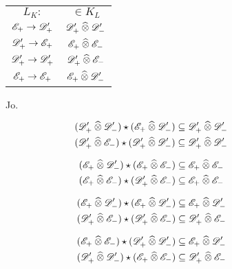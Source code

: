 \begin{figure}
    \centering
    \begin{tabular}{cc}
        $ L_K \colon $
        &
        $ \in K_L $
        \\[3ex]
        $ \fsSmocau \to \fsDiscau $
        &
        $ \fsDiscau \ctepro \fsDisaca $
        \\[3ex]
        $ \fsDiscau \to \fsSmocau $
        &
        $ \fsSmocau \ctepro \fsSmoaca $
        \\[3ex]
        $ \fsDiscau \to \fsDiscau $
        &
        $ \fsDiscau \ctepro \fsSmoaca $
        \\[3ex]
        $ \fsSmocau \to \fsSmocau $
        &
        $ \fsSmocau \ctepro \fsDisaca $
    \end{tabular}
    \caption{Jo.}
\end{figure}

\begin{align}
    ( \fsDiscau \ctepro \fsDisaca ) \star ( \fsSmocau \ctepro \fsDisaca )
    &\subs
    \fsDiscau \ctepro \fsDisaca
    \\
    ( \fsDiscau \ctepro \fsSmoaca ) \star ( \fsDiscau \ctepro \fsDisaca )
    &\subs
    \fsDiscau \ctepro \fsDisaca
\end{align}

\begin{align}
    ( \fsSmocau \ctepro \fsDisaca ) \star ( \fsSmocau \ctepro \fsSmoaca )
    &\subs
    \fsSmocau \ctepro \fsSmoaca
    \\
    ( \fsSmocau \ctepro \fsSmoaca ) \star ( \fsDiscau \ctepro \fsSmoaca )
    &\subs
    \fsSmocau \ctepro \fsSmoaca
\end{align}

\begin{align}
    ( \fsSmocau \ctepro \fsDisaca ) \star ( \fsSmocau \ctepro \fsDisaca )
    &\subs
    \fsSmocau \ctepro \fsDisaca
    \\
    ( \fsDiscau \ctepro \fsSmoaca ) \star ( \fsDiscau \ctepro \fsSmoaca )
    &\subs
    \fsDiscau \ctepro \fsSmoaca
\end{align}

\begin{align}
    ( \fsSmocau \ctepro \fsSmoaca ) \star ( \fsDiscau \ctepro \fsDisaca )
    &\subs
    \fsSmocau \ctepro \fsDisaca
    \\
    ( \fsDiscau \ctepro \fsDisaca ) \star ( \fsSmocau \ctepro \fsSmoaca )
    &\subs
    \fsDiscau \ctepro \fsSmoaca
\end{align}